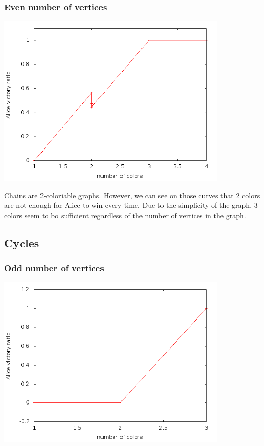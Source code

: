 \subsubsection{Even number of vertices}

\includegraphics[width=11cm]{resultats/chainepaire.png}

Chains are 2-coloriable graphs. However, we can see on those curves that 2 colors are not enough for Alice to win every time. Due to the simplicity of the graph, 3 colors seem to bo sufficient regardless of the number of vertices in the graph.

\subsection{Cycles}

\subsubsection{Odd number of vertices}

\includegraphics[width=11cm]{resultats/cycleimpair.png}

